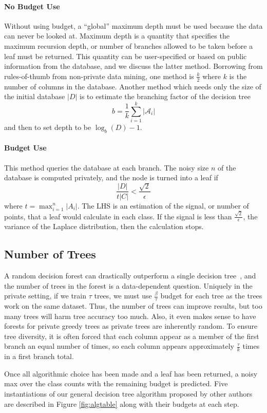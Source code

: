 \documentclass[11pt]{report}
\begin{document}
\paragraph{No Budget Use} Without using budget, a ``global'' maximum depth must be used because the data can never be looked at. Maximum depth is a quantity that specifies the maximum recursion depth, or number of branches allowed to be taken before a leaf must be returned. This quantity can be user-specified or based on public information from the database, and we discuss the latter method. Borrowing from rules-of-thumb from non-private data mining, one method is $\frac{k}{2}$ where $k$ is the number of columns in the database. Another method which needs only the size of the initial database $|D|$ is to estimate the branching factor of the decision tree
\[
b = \frac{1}{k}\sum_{i=1}^k|\mathcal{A}_i|
\]
and then to set depth to be $\log_b(D)-1$.
\paragraph{Budget Use} This method queries the database at each branch. The noisy size $n$ of the database is computed privately, and the node is turned into a leaf if
\[
\frac{|D|}{t|C|} < \frac{\sqrt{2}}{\epsilon}
\]
where $t = \max_{i=1}^n|A_i|$. The LHS is an estimation of the signal, or number of points, that a leaf would calculate in each class. If the signal is less than $\frac{\sqrt{2}}{\epsilon}$, the variance of the Laplace distribution, then the calculation stops.

\subsection{Number of Trees}
A random decision forest can drastically outperform a single decision tree~\cite{Fletcher:2016}, and the number of trees in the forest is a data-dependent question. Uniquely in the private setting, if we train $\tau$ trees, we must use $\frac{\beta}{\tau}$ budget for each tree as the trees work on the same dataset. Thus, the number of trees can improve results, but too many trees will harm tree accuracy too much. Also, it even makes sense to have forests for private greedy trees as private trees are inherently random. To ensure tree diversity, it is often forced that each column appear as a member of the first branch an equal number of times, so each column appears approximately $\frac{\tau}{k}$ times in a first branch total.

Once all algorithmic choice has been made and a leaf has been returned, a noisy max over the class counts with the remaining budget is predicted.
Five instantiations of our general decision tree algorithm proposed by other authors are described in Figure \ref{fig:algtable} along with their budgets at each step.
\end{document}
